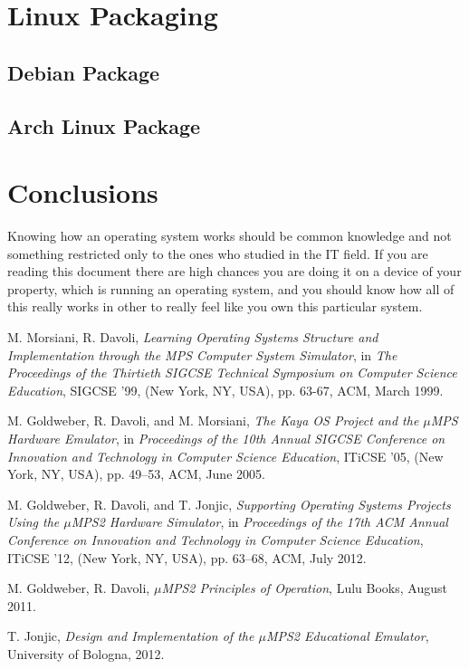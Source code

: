 \documentclass[12pt,a4paper,openright,twoside]{report}
\begin{document}
\chapter{Linux Packaging}
\lhead[\fancyplain{}{\bfseries\thepage}]{\fancyplain{}{\bfseries\rightmark}}
\section{Debian Package}
\section{Arch Linux Package}
\chapter{Conclusions}
\lhead[\fancyplain{}{\bfseries\thepage}]{\fancyplain{}{\bfseries\rightmark}}
	Knowing how an operating system works should be common knowledge and not something restricted only to the ones who studied in the IT field.
	If you are reading this document there are high chances you are doing it on a device of your property, which is running an operating system, and you should know how all of this really works in other to really feel like you own this particular system.
\begin{thebibliography}{99}

	M. Morsiani, R. Davoli,
	\textit{Learning Operating Systems Structure and Implementation through the MPS Computer System Simulator},
	in \textit{The Proceedings of the Thirtieth SIGCSE Technical Symposium on Computer Science Education},
	SIGCSE ’99, (New York, NY, USA), pp. 63-67, ACM, March 1999.

	M. Goldweber, R. Davoli, and M. Morsiani,
	\textit{The Kaya OS Project and the $\mu$MPS Hardware Emulator},
	in \textit{Proceedings of the 10th Annual SIGCSE Conference on Innovation and Technology in Computer Science Education},
	ITiCSE ’05, (New York, NY, USA), pp. 49–53, ACM, June 2005.
	
	M. Goldweber, R. Davoli, and T. Jonjic,
	\textit{Supporting Operating Systems Projects Using the $\mu$MPS2 Hardware Simulator},
	in \textit{Proceedings of the 17th ACM Annual Conference on Innovation and Technology in Computer Science Education},
	ITiCSE ’12, (New York, NY, USA), pp. 63–68, ACM, July 2012.
	
	M. Goldweber, R. Davoli,
	\textit{$\mu$MPS2 Principles of Operation},
	Lulu Books, August 2011.
	
	T. Jonjic,
	\textit{Design and Implementation of the $\mu$MPS2 Educational Emulator},
	University of Bologna, 2012.

\end{thebibliography}
\end{document}
